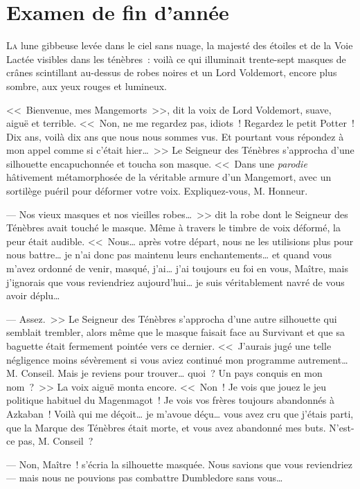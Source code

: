 \chapter{Examen de fin d’année}

\lettrine{L}{a} lune gibbeuse levée dans le ciel sans nuage, la majesté des étoiles et de la Voie Lactée visibles dans les ténèbres~: voilà ce qui illuminait trente-sept masques de crânes scintillant au-dessus de robes noires et un Lord Voldemort, encore plus sombre, aux yeux rouges et lumineux.

<<~Bienvenue, mes Mangemorts~>>, dit la voix de Lord Voldemort, suave, aiguë et terrible. <<~Non, ne me regardez pas, idiots~! Regardez le petit Potter~! Dix ans, voilà dix ans que nous nous sommes vus. Et pourtant vous répondez à mon appel comme si c'était hier…~>> Le Seigneur des Ténèbres s'approcha d'une silhouette encapuchonnée et toucha son masque. <<~Dans une \emph{parodie} hâtivement métamorphosée de la véritable armure d'un Mangemort, avec un sortilège puéril pour déformer votre voix. Expliquez-vous, M. Honneur.

--- Nos vieux masques et nos vieilles robes…~>> dit la robe dont le Seigneur des Ténèbres avait touché le masque. Même à travers le timbre de voix déformé, la peur était audible. <<~Nous… après votre départ, nous ne les utilisions plus pour nous battre… je n'ai donc pas maintenu leurs enchantements… et quand vous m'avez ordonné de venir, masqué, j'ai… j'ai toujours eu foi en vous, Maître, mais j'ignorais que vous reviendriez aujourd'hui… je suis véritablement navré de vous avoir déplu…

--- Assez.~>> Le Seigneur des Ténèbres s'approcha d'une autre silhouette qui semblait trembler, alors même que le masque faisait face au Survivant et que sa baguette était fermement pointée vers ce dernier. <<~J'aurais jugé une telle négligence moins sévèrement si vous aviez continué mon programme autrement… M. Conseil. Mais je reviens pour trouver… quoi~? Un pays conquis en mon nom~?~>> La voix aiguë monta encore. <<~Non~! Je vois que jouez le jeu politique habituel du Magenmagot~! Je vois vos frères toujours abandonnés à Azkaban~! Voilà qui me déçoit… je m'avoue déçu… vous avez cru que j'étais parti, que la Marque des Ténèbres était morte, et vous avez abandonné mes buts. N'est-ce pas, M. Conseil~?

--- Non, Maître~! s'écria la silhouette masquée. Nous savions que vous reviendriez — mais nous ne pouvions pas combattre Dumbledore sans vous…

